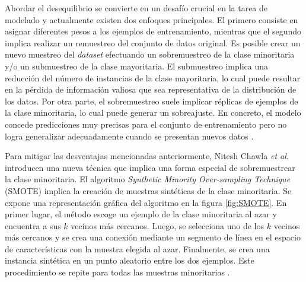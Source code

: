 Abordar el desequilibrio se convierte en un desafío crucial en la tarea de modelado y actualmente existen 
dos enfoques principales. El primero consiste en asignar diferentes pesos a los ejemplos de entrenamiento, 
mientras que el segundo implica realizar un remuestreo del conjunto de datos original. Es posible crear 
un nuevo muestreo del \emph{dataset} efectuando un sobremuestreo de la clase minoritaria y/o un submuestreo 
de la clase mayoritaria. El submuestreo implica una reducción del número de instancias de la clase mayoritaria, 
lo cual puede resultar en la pérdida de información valiosa que sea representativa de la distribución de los 
datos. Por otra parte, el sobremuestreo suele implicar réplicas de ejemplos de la clase minoritaria, lo cual 
puede generar un sobreajuste. En concreto, el modelo concede predicciones muy precisas para el conjunto de 
entrenamiento pero no logra generalizar adecuadamente cuando se presentan nuevos datos \citep{CITE:37}. 

Para mitigar las desventajas mencionadas anteriormente, Nitesh Chawla \emph{et al.} \citep{CITE:37} 
introducen una nueva técnica que implica una forma especial 
de sobremuestrear la clase minoritaria. El algoritmo 
\emph{Synthetic Minority Over-sampling Technique} (SMOTE) implica la creación de muestras sintéticas de 
la clase minoritaria. Se expone una representación gráfica del algoritmo en la figura \ref{fig:SMOTE}. 
En primer lugar, el método escoge un ejemplo de la clase minoritaria al azar y encuentra a sus $k$ vecinos 
más cercanos. Luego, se selecciona uno de los $k$ vecinos más cercanos y se crea una conexión mediante 
un segmento de línea en el espacio de características con la muestra elegida al azar. Finalmente, se crea 
una instancia sintética en un punto aleatorio entre los dos ejemplos. Este procedimiento se repite para
todas las muestras minoritarias \citep{CITE:38}. 

